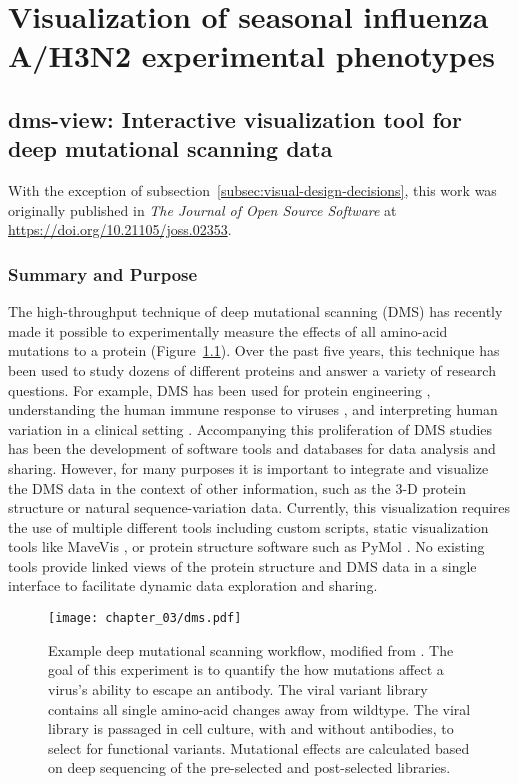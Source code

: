 \chapter{Visualization of seasonal influenza A/H3N2 experimental phenotypes}

\section{dms-view: Interactive visualization tool for deep mutational scanning data}

With the exception of subsection~\ref{subsec:visual-design-decisions}, this work was originally published in \emph{The Journal of Open Source Software} at \url{https://doi.org/10.21105/joss.02353}.

\subsection{Summary and Purpose}

The high-throughput technique of deep mutational scanning (DMS) \citep{fowler2014deep} has recently made it possible to experimentally measure the effects of all amino-acid mutations to a protein (Figure~\ref{fig:dms}).
Over the past five years, this technique has been used to study dozens of different proteins \citep{esposito2019mavedb} and answer a variety of research questions.
For example, DMS has been used for protein engineering \citep{wrenbeck2017deep}, understanding the human immune response to viruses \citep{Lee2019}, and interpreting human variation in a clinical setting \citep{starita2017variant,gelman2019recommendations}.
Accompanying this proliferation of DMS studies has been the development of software tools \citep{bloom2015software,rubin2017statistical} and databases \citep{esposito2019mavedb} for data analysis and sharing.
However, for many purposes it is important to integrate and visualize the DMS data in the context of other information, such as the 3-D protein structure or natural sequence-variation data.
Currently, this visualization requires the use of multiple different tools including custom scripts, static visualization tools like MaveVis \citep{esposito2019mavedb}, or protein structure software such as PyMol \citep{PyMOL}.
No existing tools provide linked views of the protein structure and DMS data in a single interface to facilitate dynamic data exploration and sharing.

\begin{figure}
  \centering
  \texttt{[image: chapter\_03/dms.pdf]}
  \caption{Example deep mutational scanning workflow, modified from \citet{Lee2019}. The goal of this experiment is to quantify the how mutations affect a virus's ability to escape an antibody. The viral variant library contains all single amino-acid changes away from wildtype. The viral library is passaged in cell culture, with and without antibodies, to select for functional variants. Mutational effects are calculated based on deep sequencing of the pre-selected and post-selected libraries.\label{fig:dms}}
\end{figure}

